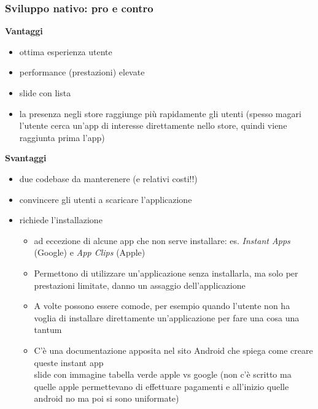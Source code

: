 \subsubsection{Sviluppo nativo: pro e contro}
\par \textbf{Vantaggi}
\begin{itemize}
    \item ottima esperienza utente
    \item performance (prestazioni) elevate
    \item slide con lista
    \item la presenza negli store raggiunge più rapidamente gli utenti (spesso magari l'utente cerca un'app di interesse direttamente nello store, quindi viene raggiunta prima l'app)
\end{itemize}

\par \textbf{Svantaggi}
\begin{itemize}
    \item due codebase da manterenere (e relativi costi!!)
    \item convincere gli utenti a scaricare l'applicazione
    \item richiede l'installazione
    \begin{itemize}
        \item ad eccezione di alcune app che non serve installare: es. \textit{Instant Apps} (Google) e \textit{App Clips} (Apple)
        \item Permettono di utilizzare un'applicazione senza installarla, ma solo per prestazioni limitate, danno un assaggio dell'applicazione
        \item A volte possono essere comode, per esempio quando l'utente non ha voglia di installare direttamente un'applicazione per fare una cosa una tantum
        \item C'è una documentazione apposita nel sito Android che spiega come creare queste instant app \\
        slide con immagine tabella verde apple vs google (non c'è scritto ma quelle apple permettevano di effettuare pagamenti e all'inizio quelle android no ma poi si sono uniformate)
    \end{itemize}
\end{itemize}

